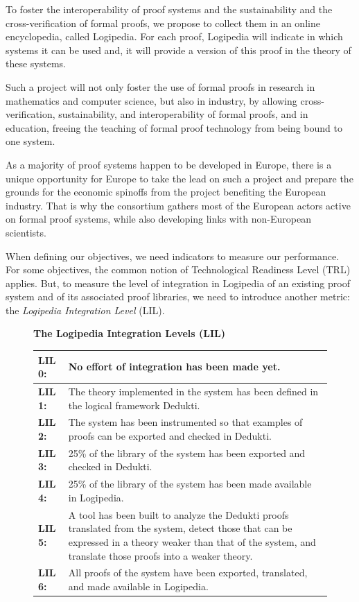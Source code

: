 To foster the interoperability of proof systems and the sustainability
and the cross-verification of formal proofs, we propose to collect
them in an online encyclopedia, called Logipedia.  For each proof,
Logipedia will indicate in which systems it can be used and, it will
provide a version of this proof in the theory of these systems.

Such a project will not only foster the use of formal proofs in
research in mathematics and computer science, but also in industry, by
allowing cross-verification, sustainability, and interoperability of
formal proofs, and in education, freeing the teaching of formal proof
technology from being bound to one system.

As a
majority of proof systems happen to be developed in Europe, there is a unique
opportunity for Europe to take the lead on such a project and prepare
the grounds for the economic spinoffs from the project benefiting
the European industry. That is why the consortium gathers most of the
European actors active on formal proof systems, while also developing
links with non-European scientists.

When defining our objectives, we need indicators to measure our
performance. For some objectives, the common notion of Technological
Readiness Level (TRL) applies. But, to measure the level of integration
in Logipedia of an existing proof system and of its associated proof
libraries, we need to introduce another metric: the {\em Logipedia
  Integration Level} (LIL).

\begin{figure}[ht]
\begin{shaded}
\begin{center}
{\bf \Large The Logipedia Integration Levels (LIL)\label{lil}}
\end{center}

\begin{longtable}{|p{}|p{}|}
\hline
{\bf LIL 0:} & No effort of integration has been made yet.\\
\hline
{\bf LIL 1:} & The theory implemented in the system has been defined in
the logical framework Dedukti.\\
\hline
{\bf LIL 2:} & The system has been instrumented so that examples of proofs
can be exported and checked in Dedukti.\\
\hline
{\bf LIL 3:} & 25\% of the library of the system has been
exported and checked in Dedukti.\\
\hline
{\bf LIL 4:} & 25\% of the library of the system has
been made available in Logipedia.\\
\hline
{\bf LIL 5:} & A tool has been built to analyze the Dedukti proofs
translated from the system, detect those that can be expressed in a theory
weaker than that of the system, and translate those proofs into a
weaker theory.\\
\hline
{\bf LIL 6:} & All proofs of the system have been exported, translated,
and made available in Logipedia.\\
\hline
\end{longtable}
\end{shaded}
\end{figure}

